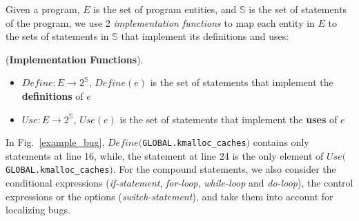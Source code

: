 Given a program, $E$ is the set of program entities, and $\mathbb{S}$
is the set of statements of the program, we use 2
\textit{implementation functions} to map each entity in $E$ to the
sets of statements in $\mathbb{S}$ that implement its definitions and
uses:
\begin{Definition}{({\bf Implementation Functions}).}
\begin{itemize}
  \item $Define:E \to 2^\mathbb{S}$, $Define(e)$ is the set of statements that 
  implement the {\bf definitions} of $e$
  \item $Use:E \to 2^\mathbb{S}$, $Use(e)$ is the set of statements that 
  implement the {\bf uses} of $e$
\end{itemize}
\end{Definition}
In Fig.~\ref{example_bug},
$Define($\texttt{GLOBAL.kmalloc\_caches}$)$ contains only statements
at line 16, while, the statement at line 24 is the only element of
$Use($\texttt{GLOBAL.kmalloc\_caches}$)$. For the compound
statements, we also consider the conditional expressions
(\textit{if-statement}, \textit{for-loop}, \textit{while-loop} and
\textit{do-loop}), the control expressions or the options
(\textit{switch-statement}), and take them into account for localizing
bugs.
%

%

%

